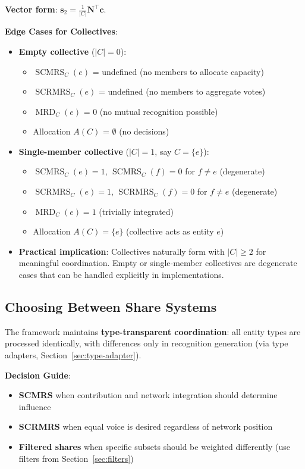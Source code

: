\documentclass[11pt,a4paper]{article}
\theoremstyle{definition}
\theoremstyle{remark}
\DeclareMathOperator{\SCMRS}{SCMRS}
\DeclareMathOperator{\SCRMRS}{SCRMRS}
\DeclareMathOperator{\MRD}{MRD}
\begin{document}
\textbf{Vector form}: $\mathbf{s}_2 = \frac{1}{|C|}\mathbf{N}^\top \mathbf{c}$.

\textbf{Edge Cases for Collectives}:

\begin{itemize}
\item \textbf{Empty collective} ($|C| = 0$):
  \begin{itemize}
  \item $\SCMRS_C(e)$ = undefined (no members to allocate capacity)
  \item $\SCRMRS_C(e)$ = undefined (no members to aggregate votes)
  \item $\MRD_C(e)$ = 0 (no mutual recognition possible)
  \item Allocation $A(C)$ = $\emptyset$ (no decisions)
  \end{itemize}

\item \textbf{Single-member collective} ($|C| = 1$, say $C = \{e\}$):
  \begin{itemize}
  \item $\SCMRS_C(e) = 1$, $\SCMRS_C(f) = 0$ for $f \ne e$ (degenerate)
  \item $\SCRMRS_C(e) = 1$, $\SCRMRS_C(f) = 0$ for $f \ne e$ (degenerate)
  \item $\MRD_C(e) = 1$ (trivially integrated)
  \item Allocation $A(C) = \{e\}$ (collective acts as entity $e$)
  \end{itemize}

\item \textbf{Practical implication}: Collectives naturally form with $|C| \ge 2$ for meaningful coordination. Empty or single-member collectives are degenerate cases that can be handled explicitly in implementations.
\end{itemize}

\subsection{Choosing Between Share Systems}

The framework maintains \textbf{type-transparent coordination}: all entity types are processed identically, with differences only in recognition generation (via type adapters, Section~\ref{sec:type-adapter}).

\textbf{Decision Guide}:
\begin{itemize}
\item \textbf{SCMRS} when contribution and network integration should determine influence
\item \textbf{SCRMRS} when equal voice is desired regardless of network position
\item \textbf{Filtered shares} when specific subsets should be weighted differently (use filters from Section~\ref{sec:filters})
\end{itemize}
\end{document}
